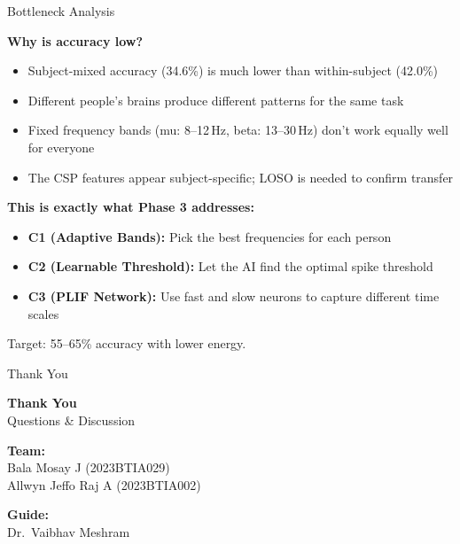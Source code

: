 \documentclass[10pt]{beamer}
\begin{document}
\begin{frame}{Bottleneck Analysis}

\small
\textbf{Why is accuracy low?}

\vspace{4pt}
\begin{itemize}
  \item Subject-mixed accuracy (34.6\%) is much lower than within-subject (42.0\%)
  \item Different people's brains produce different patterns for the same task
  \item Fixed frequency bands (mu: 8--12\,Hz, beta: 13--30\,Hz) don't work equally well for everyone
  \item The CSP features appear subject-specific; LOSO is needed to confirm transfer
\end{itemize}

\vspace{4pt}
\textbf{This is exactly what Phase 3 addresses:}

\vspace{4pt}
\begin{itemize}
  \item \textbf{C1 (Adaptive Bands):} Pick the best frequencies for each person
  \item \textbf{C2 (Learnable Threshold):} Let the AI find the optimal spike threshold
  \item \textbf{C3 (PLIF Network):} Use fast and slow neurons to capture different time scales
\end{itemize}

\vspace{4pt}
Target: 55--65\% accuracy with lower energy.

\end{frame}

\begin{frame}{Thank You}

\begin{center}
\vspace{10pt}
{\Large\textbf{Thank You}}\\[12pt]
{\large Questions \& Discussion}

\vspace{20pt}
\textbf{Team:}\\
Bala Mosay J \quad (2023BTIA029)\\
Allwyn Jeffo Raj A \quad (2023BTIA002)

\vspace{10pt}
\textbf{Guide:}\\
Dr.\ Vaibhav Meshram
\end{center}

\end{frame}
\end{document}
